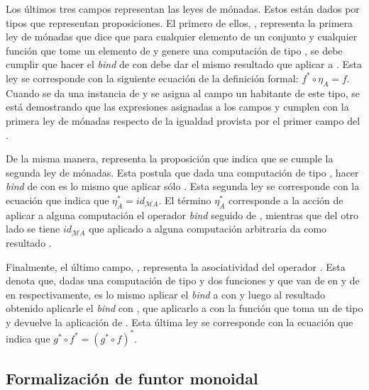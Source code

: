 Los últimos tres campos representan las leyes de mónadas. Estos están dados por tipos que representan proposiciones. El primero de ellos, , representa la primera ley de mónadas que dice que para cualquier elemento  de un conjunto  y cualquier función  que tome un elemento de  y genere una computación de tipo , se debe cumplir que hacer el \textit{bind} de   con  debe dar el mismo resultado que aplicar  a . Esta ley se corresponde con la siguiente ecuación de la definición formal: $f^* \circ \eta_A = f$. Cuando se da una instancia de  y se asigna al campo  un habitante de este tipo, se está demostrando que las expresiones asignadas a los campos  y \AgdaField{$\_\gg=\_$} cumplen con la primera ley de mónadas respecto de la igualdad provista por el primer campo del .

De la misma manera,  representa la proposición que indica que se cumple la segunda ley de mónadas. Esta postula que dada una computación  de tipo , hacer \textit{bind} de  con  es lo mismo que aplicar sólo . Esta segunda ley se corresponde con la ecuación que indica que $\eta_A^* = id_{\mathcal{M} A}$. El término $\eta_A^*$ corresponde a la acción de aplicar a alguna computación  el operador \textit{bind} seguido de , mientras que del otro lado se tiene $id_{\mathcal{M} A}$ que aplicado a alguna computación arbitraria  da como resultado .

Finalmente, el último campo, , representa la asociatividad del operador \hbox{\AgdaField{$\gg=$}}. Esta denota que, dadas una computación  de tipo  y dos funciones  y  que van de  en \hbox{} y de  en  respectivamente, es lo mismo aplicar el \textit{bind} a  con  y luego al resultado obtenido aplicarle el \textit{bind} con , que aplicarlo a  con la función que toma un  de tipo  y devuelve la aplicación de  \AgdaField{$\gg=$} . Esta última ley se corresponde con la ecuación que indica que $g^* \circ f^* = (g^* \circ f)^*$. 

\subsection{Formalización de funtor monoidal}\label{funtmon:funt}

